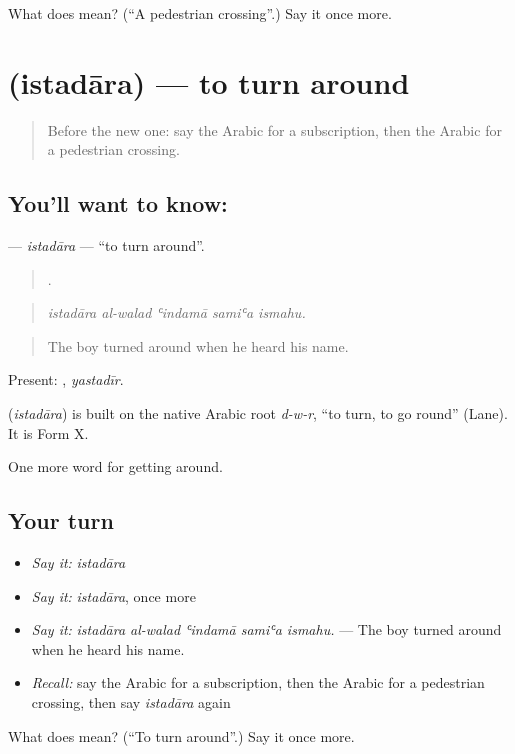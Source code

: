 \begin{tcolorbox}[breakable,colback=teal!4,colframe=teal!35!black,title={Before you move on}]
What does   mean? (\textquotedblleft{}A pedestrian crossing\textquotedblright{}.) Say it once more.
\end{tcolorbox}
\section[\texorpdfstring{\ar{استدار} (istadāra)}{استدار (istadāra)}]{ (istadāra) — to turn around}

\label{lesson:AR-C435-istadara}



\begin{quote}
Before the new one: say the Arabic for a subscription, then the Arabic for a pedestrian crossing.
\end{quote}

\subsection*{You'll want to know: }
\textbf{} — \emph{istadāra} — \textquotedblleft{}to turn around\textquotedblright{}.

\begin{quote}
    .
\end{quote}

\begin{quote}
\emph{istadāra al-walad ʿindamā samiʿa ismahu.}
\end{quote}

\begin{quote}
The boy turned around when he heard his name.
\end{quote}

Present: , \emph{yastadīr}.

\begin{cousinweb}
\textbf{} (\emph{istadāra}) is built on the native Arabic root \emph{d-w-r}, \textquotedblleft{}to turn, to go round\textquotedblright{} (Lane). It is Form X.
\end{cousinweb}

\begin{grammarlens}[title={What you've built}]
One more word for getting around.
\end{grammarlens}

\subsection*{Your turn}
\begin{itemize}
\raggedright
  \item \emph{Say it:} \emph{istadāra}
  \item \emph{Say it:} \emph{istadāra}, once more
  \item \emph{Say it:} \emph{istadāra al-walad ʿindamā samiʿa ismahu.} — The boy turned around when he heard his name.
  \item \emph{Recall:} say the Arabic for a subscription, then the Arabic for a pedestrian crossing, then say \emph{istadāra} again
\end{itemize}

\begin{tcolorbox}[breakable,colback=teal!4,colframe=teal!35!black,title={Before you move on}]
What does  mean? (\textquotedblleft{}To turn around\textquotedblright{}.) Say it once more.
\end{tcolorbox}
